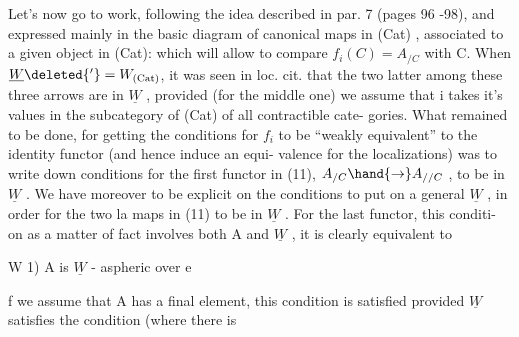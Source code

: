 Let's now go to work, following the idea described in par. 7
(pages 96 -98), and expressed mainly in the basic diagram of canonical
maps in (Cat) , associated to a given object  in (Cat):
which will allow to compare $f_i(C) = A_{/C}$ with C. When $\underline{W}\deleted{'} = W_{(\mathrm{Cat})}$, it
was seen in loc. cit. that the two latter among these three arrows
are in $\underline{W}$ ,  provided (for the middle one) we assume that
i takes it's values in the subcategory of (Cat) of all contractible cate-%
gories. What remained to be done, for getting the conditions for $f_i$ to
be ``weakly equivalent'' to the identity functor (and hence induce an equi-%
valence for the localizations) was to write down conditions for the
first functor in (11), $A_{/C} \hand{\to} A_{//C}$ , to be in $\underline{W}$ . We have moreover to
be explicit on the conditions to put on a general $\underline{W}$ , in order for the
two la maps in (11) to be in $\underline{W}$ . For the last functor, this conditi-%
on as a matter of fact involves both A and $\underline{W}$ , it is clearly equivalent
to

W 1) A is $\underline{W}$ - aspheric over e \hand{\unsure{;}}

f we assume that A has a final element, this condition is 
satisfied provided $\underline{W}$ satisfies the  condition (where there is

